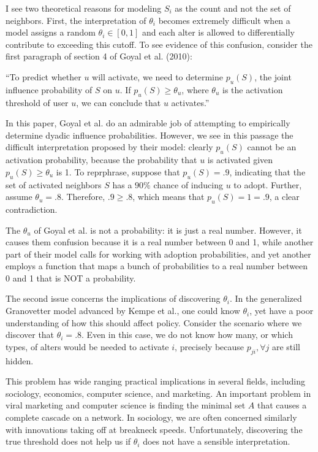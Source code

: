 \documentclass{article}
\begin{document}
I see two theoretical reasons for modeling $S_i$ as the count and not the set of neighbors. First, the interpretation of $\theta_i$ becomes extremely difficult when a model assigns a random $\theta_i \in [0,1]$ and each alter is allowed to differentially contribute to exceeding this cutoff. To see evidence of this confusion, consider the first paragraph of section 4 of Goyal et al. (2010):

``To predict whether $u$ will activate, we need to determine $p_u(S)$, the joint influence probability of $S$ on $u$. If $p_u(S) \ge \theta_u$, where $\theta_u$ is the activation threshold of user $u$, we can conclude that $u$ activates.''

In this paper, Goyal et al. do an admirable job of attempting to empirically determine dyadic influence probabilities. However, we see in this passage the difficult interpretation proposed by their model: clearly $p_u(S)$ cannot be an activation probability, because the probability that $u$ is activated given $p_u(S) \ge \theta_u$ is 1. To reprphrase, suppose that $p_u(S) = .9$, indicating that the set of activated neighbors $S$ has a $90\%$ chance of inducing $u$ to adopt. Further, assume $\theta_u = .8$. Therefore, $.9 \ge .8$, which means that $p_u(S) = 1 = .9$, a clear contradiction.

The $\theta_u$ of Goyal et al. is not a probability: it is just a real number. However, it causes them confusion because it is a real number between 0 and 1, while another part of their model calls for working with adoption probabilities, and yet another employs a function that maps a bunch of probabilities to a real number between 0 and 1 that is NOT a probability.

The second issue concerns the implications of discovering $\theta_i$. In the generalized Granovetter model advanced by Kempe et al., one could know $\theta_i$, yet have a poor understanding of how this should affect policy. Consider the scenario where we discover that $\theta_i = .8$. Even in this case, we do not know how many, or which types, of alters would be needed to activate $i$, precisely because $p_{ji}, \forall j$ are still hidden.

This problem has wide ranging practical implications in several fields, including sociology, economics, computer science, and marketing. An important problem in viral marketing and computer science is finding the minimal set $A$ that causes a complete cascade on a network. In sociology, we are often concerned similarly with innovations taking off at breakneck speeds. Unfortunately, discovering the true threshold does not help us if $\theta_i$ does not have a sensible interpretation.
\end{document}
